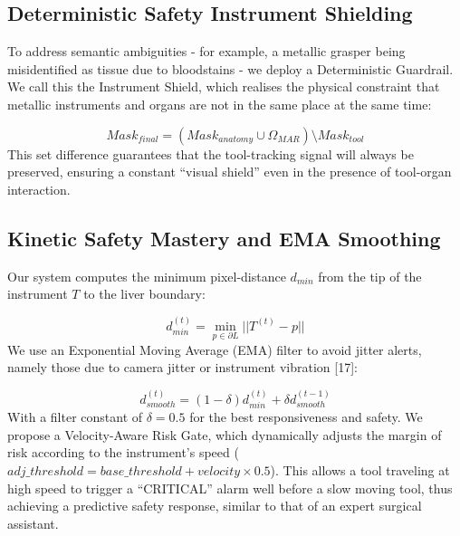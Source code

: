 \documentclass[conference]{IEEEtran}
\begin{document}
\subsection{Deterministic Safety Instrument Shielding}
To address semantic ambiguities - for example, a metallic grasper being misidentified as tissue due to bloodstains - we deploy a Deterministic Guardrail. We call this the Instrument Shield, which realises the physical constraint that metallic instruments and organs are not in the same place at the same time:

\begin{equation}
Mask_{final} = (Mask_{anatomy} \cup \Omega_{MAR}) \setminus Mask_{tool}
\end{equation}
This set difference guarantees that the tool-tracking signal will always be preserved, ensuring a constant ``visual shield'' even in the presence of tool-organ interaction.

\subsection{Kinetic Safety Mastery and EMA Smoothing}
Our system computes the minimum pixel-distance $d_{min}$ from the tip of the instrument $T$ to the liver boundary:

\begin{equation}
d_{min}^{(t)} = \min_{p \in \partial L} || T^{(t)} - p ||
\end{equation}
We use an Exponential Moving Average (EMA) filter to avoid jitter alerts, namely those due to camera jitter or instrument vibration [17]:

\begin{equation}
d_{smooth}^{(t)} = (1 - \delta) d_{min}^{(t)} + \delta d_{smooth}^{(t-1)}
\end{equation}
With a filter constant of $\delta = 0.5$ for the best responsiveness and safety. We propose a Velocity-Aware Risk Gate, which dynamically adjusts the margin of risk according to the instrument's speed ($adj\_threshold = base\_threshold + velocity \times 0.5$). This allows a tool traveling at high speed to trigger a ``CRITICAL'' alarm well before a slow moving tool, thus achieving a predictive safety response, similar to that of an expert surgical assistant.
\end{document}
